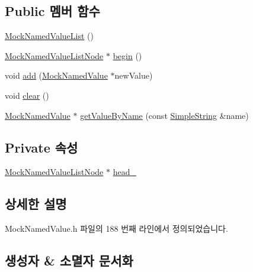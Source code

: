 \subsection*{Public 멤버 함수}
\begin{DoxyCompactItemize}
\item 
\hyperlink{class_mock_named_value_list_a30e514de3469002b96b55747584d87f6}{Mock\+Named\+Value\+List} ()
\item 
\hyperlink{class_mock_named_value_list_node}{Mock\+Named\+Value\+List\+Node} $\ast$ \hyperlink{class_mock_named_value_list_a4a5976d05542385eb64ea73eee7fc59c}{begin} ()
\item 
void \hyperlink{class_mock_named_value_list_af014a0a639125fd0c69df2aadcd22bf6}{add} (\hyperlink{class_mock_named_value}{Mock\+Named\+Value} $\ast$new\+Value)
\item 
void \hyperlink{class_mock_named_value_list_ac8bb3912a3ce86b15842e79d0b421204}{clear} ()
\item 
\hyperlink{class_mock_named_value}{Mock\+Named\+Value} $\ast$ \hyperlink{class_mock_named_value_list_aa38eeec8da4bf05087e65e24cab62437}{get\+Value\+By\+Name} (const \hyperlink{class_simple_string}{Simple\+String} \&name)
\end{DoxyCompactItemize}
\subsection*{Private 속성}
\begin{DoxyCompactItemize}
\item 
\hyperlink{class_mock_named_value_list_node}{Mock\+Named\+Value\+List\+Node} $\ast$ \hyperlink{class_mock_named_value_list_a3bb1ff05bd34f0ac2f0ff66d8f5e2978}{head\+\_\+}
\end{DoxyCompactItemize}


\subsection{상세한 설명}


Mock\+Named\+Value.\+h 파일의 188 번째 라인에서 정의되었습니다.



\subsection{생성자 \& 소멸자 문서화}
